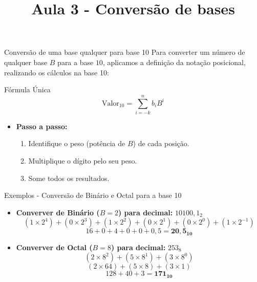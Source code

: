 \title{Aula 3 - Conversão de bases}



\begin{frame}
    \titlepage
\end{frame}


\begin{frame}{Conversão de uma base qualquer para base 10}
    Para converter um número de qualquer base $B$ para a base $10$, aplicamos a definição da notação posicional, realizando os cálculos na base 10:

    \begin{block}{Fórmula Única}
        $$ \text{Valor}_{10} = \sum_{i=-k}^{n} b_i B^i $$
    \end{block}

    \begin{itemize}
        \item \textbf{Passo a passo:}
              \begin{enumerate}
                  \item Identifique o peso (potência de $B$) de cada posição.
                  \item Multiplique o dígito pelo seu peso.
                  \item Some todos os resultados.
              \end{enumerate}
    \end{itemize}
\end{frame}

\begin{frame}{Exemplos - Conversão de Binário e Octal para a base 10}
    \begin{itemize}
        \item \textbf{Converver de Binário ($B=2$) para decimal:} $10100,1_2$
              {\small
              $$ (1 \times 2^4) + (0 \times 2^3) + (1 \times 2^2) + (0 \times 2^1) + (0 \times 2^0) + (1 \times 2^{-1}) $$
              $$ 16 + 0 + 4 + 0 + 0 + 0,5 = \mathbf{20,5_{10}} $$
              }

              \vspace{0.4cm}

        \item \textbf{Converver de Octal ($B=8$) para decimal:} $253_8$
              {\small
                      $$ (2 \times 8^2) + (5 \times 8^1) + (3 \times 8^0) $$
                      $$ (2 \times 64) + (5 \times 8) + (3 \times 1) $$
                      $$ 128 + 40 + 3 = \mathbf{171_{10}} $$
                  }
    \end{itemize}
\end{frame}

